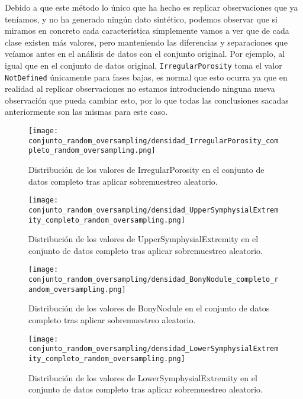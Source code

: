 Debido a que este método lo único que ha hecho es replicar observaciones que ya teníamos, y no ha generado ningún dato sintético, podemos observar que si miramos en concreto cada característica simplemente vamos a ver que de cada clase existen más valores, pero manteniendo las diferencias y separaciones que veíamos antes en el análisis de datos con el conjunto original. Por ejemplo, al igual que en el conjunto de datos original, \texttt{IrregularPorosity} toma el valor \texttt{NotDefined} únicamente para fases bajas, es normal que esto ocurra ya que en realidad al replicar observaciones no estamos introduciendo ninguna nueva observación que pueda cambiar esto, por lo que todas las conclusiones sacadas anteriormente son las mismas para este caso.


\begin{figure}[H]
	\centering
	\texttt{[image: conjunto\_random\_oversampling/densidad\_IrregularPorosity\_completo\_random\_oversampling.png]}
	\caption{Distribución de los valores de IrregularPorosity en el conjunto de datos completo tras aplicar sobremuestreo aleatorio.}
	\label{fig:densidad_IrregularPorosity_completo_random_oversampling}
\end{figure}




\begin{figure}[H]
	\centering
	\texttt{[image: conjunto\_random\_oversampling/densidad\_UpperSymphysialExtremity\_completo\_random\_oversampling.png]}
	\caption{Distribución de los valores de UpperSymphysialExtremity en el conjunto de datos completo tras aplicar sobremuestreo aleatorio.}
	\label{fig:densidad_UpperSymphysialExtremity_completo_random_oversampling}
\end{figure}


\begin{figure}[H]
	\centering
	\texttt{[image: conjunto\_random\_oversampling/densidad\_BonyNodule\_completo\_random\_oversampling.png]}
	\caption{Distribución de los valores de BonyNodule en el conjunto de datos completo tras aplicar sobremuestreo aleatorio.}
	\label{fig:densidad_BonyNodule_completo_random_oversampling}
\end{figure}



\begin{figure}[H]
	\centering
	\texttt{[image: conjunto\_random\_oversampling/densidad\_LowerSymphysialExtremity\_completo\_random\_oversampling.png]}
	\caption{Distribución de los valores de LowerSymphysialExtremity en el conjunto de datos completo tras aplicar sobremuestreo aleatorio.}
	\label{fig:densidad_LowerSymphysialExtremity_completo_random_oversampling}
\end{figure}



